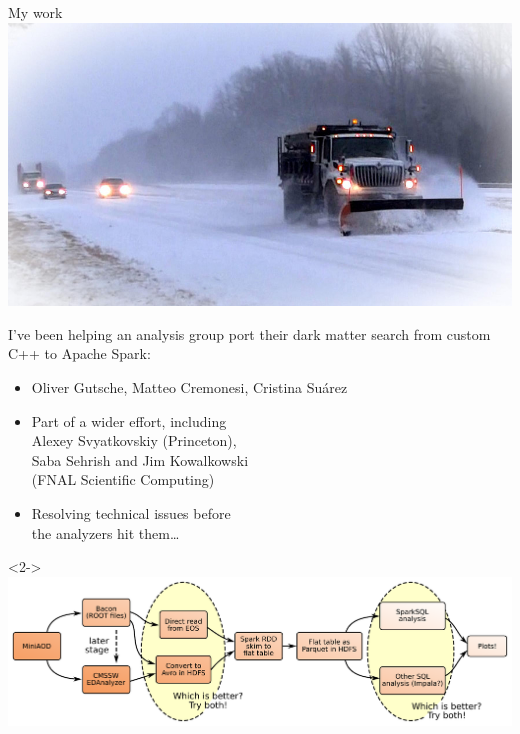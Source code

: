 \documentclass{beamer}
\begin{document}
\begin{frame}{My work}
\vspace{2.5 cm}
\mbox{ } \hfill {\hspace{0.6 cm}\includegraphics[height=2.5 cm]{snowplow.jpg}\hspace{-0.6 cm}}

\vspace{-4.7 cm}
I've been helping an analysis group port their dark matter search from custom C++ to Apache Spark:
\begin{itemize}
\item Oliver Gutsche, Matteo Cremonesi, Cristina Su\'arez
\item Part of a wider effort, including \\ Alexey Svyatkovskiy (Princeton), \\ Saba Sehrish and Jim Kowalkowski \\ (FNAL Scientific Computing)
\item Resolving technical issues before \\ the analyzers hit them\ldots
\end{itemize}

\vspace{0.3 cm}
\begin{uncoverenv}<2->
\mbox{ } \hfill \includegraphics[width=0.8\linewidth]{spark_workflow.pdf} \hfill \mbox{ }
\end{uncoverenv}
\end{frame}
\end{document}
